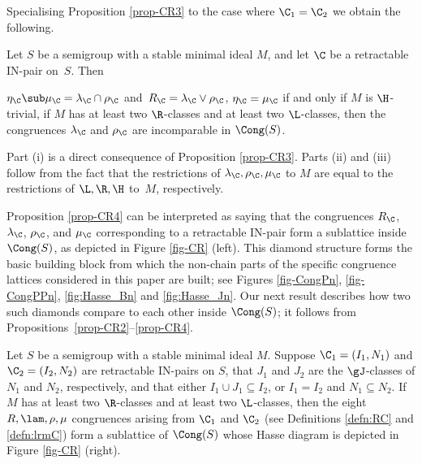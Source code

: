 Specialising Proposition \ref{prop-CR3} to the case where $\C_1=\C_2$ we obtain
the following.

\begin{prop}
\label{prop-CR4}
Let $S$ be a semigroup with a stable minimal ideal $M$, and let $\C$ be a retractable IN-pair on~$S$.  Then 
\begin{itemize}
 $\eta_\C\sub\mu_\C=\lambda_{\C}\cap \rho_{\C}$ and~$R_\C=\lambda_{\C}\vee \rho_{\C}$,
 $\eta_\C=\mu_\C$ if and only if $M$ is $\H$-trivial,
 if $M$ has at least two $\R$-classes and at least two $\L$-classes, then the congruences $\lambda_{\C}$ and $\rho_{\C}$ are incomparable in $\Cong(S)$.
\end{itemize}
\end{prop}

\pf Part (i) is a direct consequence of Proposition \ref{prop-CR3}.  Parts (ii) and (iii) follow from the fact that the restrictions of $\lambda_\C,\rho_\C,\mu_\C$ to $M$ are equal to the restrictions of $\L,\R,\H$ to~$M$, respectively. \epf

Proposition \ref{prop-CR4} can be interpreted as saying that the congruences
$R_{\C}$, $\lambda_{\C}$, $\rho_{\C}$, and $\mu_{\C}$ corresponding to a
retractable IN-pair form a sublattice inside $\Cong(S)$, as
depicted in Figure \ref{fig-CR} (left).
This diamond structure forms the basic building block from which the
non-chain parts of the specific congruence lattices considered in this paper are
built; see Figures \ref{fig-CongPn}, \ref{fig-CongPPn}, \ref{fig:Hasse_Bn} and
\ref{fig:Hasse_Jn}. Our next result describes how two such diamonds compare to
each other inside $\Cong(S)$; it follows from Propositions~\ref{prop-CR2}--\ref{prop-CR4}.


\begin{prop}
\label{prop-CR4a}
Let $S$ be a semigroup with a stable minimal ideal $M$.  Suppose $\C_1=(I_1,N_1)$ and $\C_2=(I_2, N_2)$ are retractable IN-pairs on $S$, that $J_1$ and $J_2$ are the $\gJ$-classes of $N_1$ and $N_2$, respectively, and that either $I_1\cup J_1\subseteq I_2$, or $I_1=I_2$ and $N_1\subseteq N_2$. If $M$ has at least two $\R$-classes and at least two $\L$-classes, then the eight $R,\lam,\rho,\mu$ congruences arising from $\C_1$ and $\C_2$ (see Definitions \ref{defn:RC} and \ref{defn:lrmC}) form a sublattice of $\Cong(S)$ whose Hasse diagram is depicted in Figure \ref{fig-CR} (right). \epfres
\end{prop}

